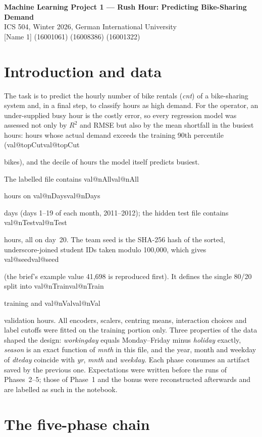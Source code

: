 \documentclass[10pt,a4paper]{article}
\makeatletter
\newcommand{\val}[1]{\ifcsname val@#1\endcsname\csname val@#1\endcsname\else
  \PackageError{report}{Undefined value #1}{Rebuild with report/build_report.py}\fi}
\makeatother
\begin{document}
\begin{center}
  {\large\bfseries Machine Learning Project 1 --- Rush Hour: Predicting Bike-Sharing Demand}\\[3pt]
  ICS 504, Winter 2026, German International University\\[2pt]
  {[Name 1]} (16001061) \quad {[Name 2]} (16008386) \quad {[Name 3]} (16001322)
\end{center}

\section{Introduction and data}
The task is to predict the hourly number of bike rentals (\emph{cnt}) of a bike-sharing system and, in a final step, to classify hours as high demand. For the operator, an under-supplied busy hour is the costly error, so every regression model was assessed not only by $R^2$ and RMSE but also by the mean shortfall in the busiest hours: hours whose actual demand exceeds the training 90th percentile (\val{topCut} bikes), and the decile of hours the model itself predicts busiest.

The labelled file contains \val{nAll} hours on \val{nDays} days (days 1--19 of each month, 2011--2012); the hidden test file contains \val{nTest} hours, all on day~20. The team seed is the SHA-256 hash of the sorted, underscore-joined student IDs taken modulo 100{,}000, which gives \val{seed} (the brief's example value 41{,}698 is reproduced first). It defines the single 80/20 split into \val{nTrain} training and \val{nVal} validation hours. All encoders, scalers, centring means, interaction choices and label cutoffs were fitted on the training portion only. Three properties of the data shaped the design: \emph{workingday} equals Monday--Friday minus \emph{holiday} exactly, \emph{season} is an exact function of \emph{mnth} in this file, and the year, month and weekday of \emph{dteday} coincide with \emph{yr}, \emph{mnth} and \emph{weekday}. Each phase consumes an artifact saved by the previous one. Expectations were written before the runs of Phases~2--5; those of Phase~1 and the bonus were reconstructed afterwards and are labelled as such in the notebook.

\section{The five-phase chain}
\end{document}
